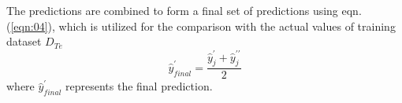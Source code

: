 The predictions are combined to form a final set of predictions using eqn. (\ref{eqn:04}), which is utilized for the comparison with the actual values of training dataset $D_{Te}$
\begin{equation}
\label{eqn:04}
\hat{y}_{final}^{\prime}=\frac{\hat{y}_j^{\prime}+\hat{y}_j^{\prime\prime}}{2}
\end{equation}
where $\hat{y}_{final}^{\prime}$ represents the final prediction.










